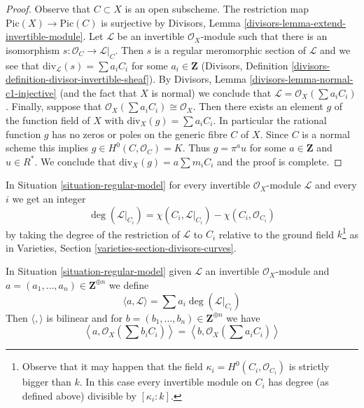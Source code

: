 \begin{proof}
Observe that $C \subset X$ is an open subscheme. The restriction
map $\text{Pic}(X) \to \text{Pic}(C)$ is surjective by
Divisors, Lemma \ref{divisors-lemma-extend-invertible-module}.
Let $\mathcal{L}$ be an invertible $\mathcal{O}_X$-module
such that there is an isomorphism $s : \mathcal{O}_C \to \mathcal{L}|_C$.
Then $s$ is a regular meromorphic section of $\mathcal{L}$
and we see that $\text{div}_\mathcal{L}(s) = \sum a_i C_i$
for some $a_i \in \mathbf{Z}$
(Divisors, Definition \ref{divisors-definition-divisor-invertible-sheaf}).
By Divisors, Lemma \ref{divisors-lemma-normal-c1-injective}
(and the fact that $X$ is normal)
we conclude that $\mathcal{L} = \mathcal{O}_X(\sum a_iC_i)$.
Finally, suppose that $\mathcal{O}_X(\sum a_i C_i) \cong \mathcal{O}_X$.
Then there exists an element $g$ of the function field of $X$
with $\text{div}_X(g) = \sum a_i C_i$. In particular the rational
function $g$ has no zeros or poles on the generic fibre $C$ of $X$.
Since $C$ is a normal scheme this implies $g \in H^0(C, \mathcal{O}_C) = K$.
Thus $g = \pi^a u$ for some $a \in \mathbf{Z}$ and $u \in R^*$.
We conclude that $\text{div}_X(g) = a \sum m_i C_i$ and the proof
is complete.
\end{proof}

\noindent
In Situation \ref{situation-regular-model} for every invertible
$\mathcal{O}_X$-module $\mathcal{L}$ and every $i$ we get an integer
$$
\deg(\mathcal{L}|_{C_i}) =
\chi(C_i, \mathcal{L}|_{C_i}) - \chi(C_i, \mathcal{O}_{C_i})
$$
by taking the degree of the restriction of $\mathcal{L}$ to $C_i$
relative to the ground field $k$\footnote{Observe that it may happen
that the field $\kappa_i = H^0(C_i, \mathcal{O}_{C_i})$ is strictly bigger
than $k$. In this case every invertible module on $C_i$ has
degree (as defined above) divisible by $[\kappa_i : k]$.}
as in Varieties, Section \ref{varieties-section-divisors-curves}.

\begin{lemma}
\label{lemma-intersection-pairing}
In Situation \ref{situation-regular-model} given $\mathcal{L}$ an invertible
$\mathcal{O}_X$-module and
$a = (a_1, \ldots, a_n) \in \mathbf{Z}^{\oplus n}$ we define
$$
\langle a, \mathcal{L} \rangle = \sum a_i\deg(\mathcal{L}|_{C_i})
$$
Then $\langle , \rangle$ is bilinear and for
$b = (b_1, \ldots, b_n) \in \mathbf{Z}^{\oplus n}$ we have
$$
\left\langle a, \mathcal{O}_X(\sum b_i C_i) \right\rangle =
\left\langle b, \mathcal{O}_X(\sum a_i C_i) \right\rangle
$$
\end{lemma}

